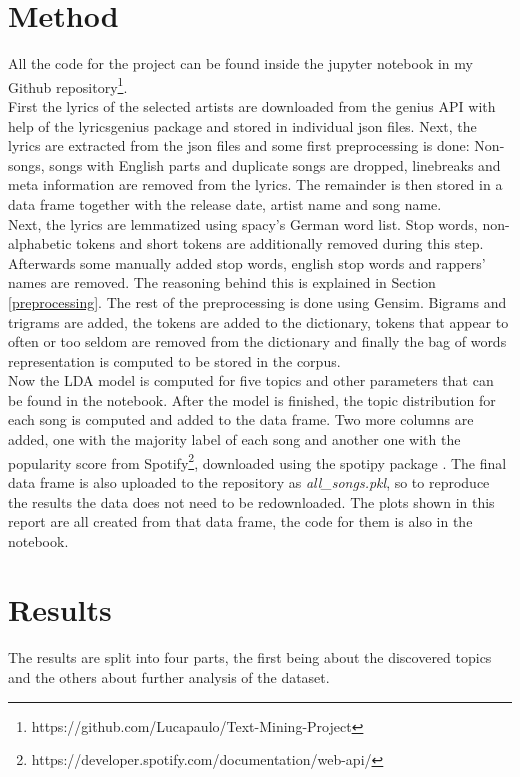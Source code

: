 \documentclass[conference]{IEEEtran}
\begin{document}
\section{Method}
All the code for the project can be found inside the jupyter notebook in my Github repository\footnote{https://github.com/Lucapaulo/Text-Mining-Project}.\\
First the lyrics of the selected artists are downloaded from the genius API with help of the lyricsgenius package \cite{lyricsgenius} and stored in individual json files. Next, the lyrics are extracted from the json files and some first preprocessing is done: Non-songs, songs with English parts and duplicate songs are dropped, linebreaks and meta information are removed from the lyrics. The remainder is then stored in a data frame together with the release date, artist name and song name.\\
Next, the lyrics are lemmatized using spacy's German word list. Stop words, non-alphabetic tokens and short tokens are additionally removed during this step. Afterwards some manually added stop words, english stop words and rappers' names are removed. The reasoning behind this is explained in Section \ref{preprocessing}. The rest of the preprocessing is done using Gensim. Bigrams and trigrams are added, the tokens are added to the dictionary, tokens that appear to often or too seldom are removed from the dictionary and finally the bag of words representation is computed to be stored in the corpus.\\
Now the LDA model is computed for five topics and other parameters that can be found in the notebook. After the model is finished, the topic distribution for each song is computed and added to the data frame. Two more columns are added, one with the majority label of each song and another one with the popularity score from Spotify\footnote{https://developer.spotify.com/documentation/web-api/}, downloaded using the spotipy package \cite{spotipy}. The final data frame is also uploaded to the repository as \textit{all\_songs.pkl}, so to reproduce the results the data does not need to be redownloaded. The plots shown in this report are all created from that data frame, the code for them is also in the notebook.

\section{Results} \label{results}
The results are split into four parts, the first being about the discovered topics and the others about further analysis of the dataset.
\end{document}
